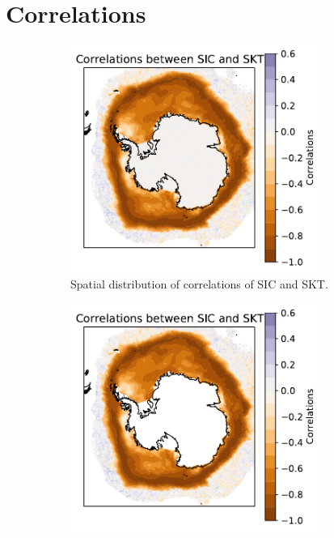 \documentclass[../main.tex]{subfiles}
\begin{document}
\section{Correlations}
\label{sec:correlations_temp_ice}

\begin{figure}[h!]
\centering
\begin{subfigure}[h!]{0.49\textwidth}
\centering
\includegraphics[width=0.9\textwidth]{images/week8/hres/corr_sic_skt_longterm_spatial}
\caption{Spatial distribution of correlations of SIC and SKT.}
\end{subfigure}
\begin{subfigure}[h!]{0.49\textwidth}
\centering
\includegraphics[width=0.9\textwidth]{images/week8/hres/corr_sic_skt_longterm_spatial_anmomalous}

\end{subfigure}
\end{figure}
\end{document}

